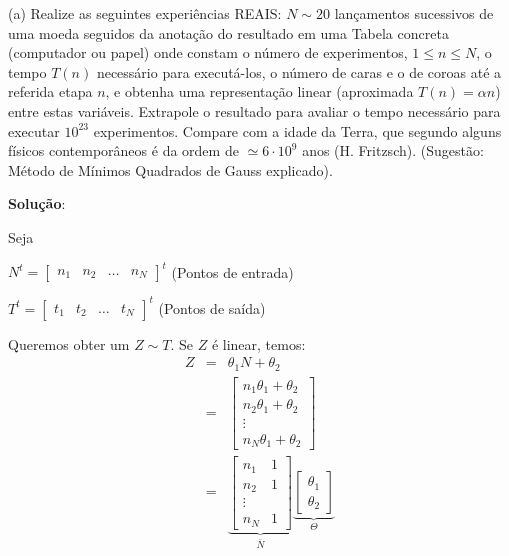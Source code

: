\begin{exercise}

\begin{description}
    \item (a) Realize as seguintes experiências REAIS: \(N\sim 20\) lançamentos sucessivos de uma moeda seguidos da anotação do resultado em uma Tabela concreta (computador ou papel) onde constam o número de experimentos, \(1 \le n \le N\), o tempo \(T(n)\) necessário para executá-los, o número de caras e o de coroas até a referida etapa \(n\), e obtenha uma representação linear (aproximada \(T(n) = \alpha n\)) entre estas variáveis. Extrapole o resultado para avaliar o tempo necessário para executar \(10^{23}\) experimentos. Compare com a idade da Terra, que segundo alguns físicos contemporâneos é da ordem de \(\simeq 6 \cdot 10^{9}\) anos (H. Fritzsch). (Sugestão: Método de Mínimos Quadrados de Gauss explicado).

{\color{red}
\textbf{Solução}:

Seja

\(N^t = \left[\begin{array}{cccc} n_1 & n_2 & \ldots & n_N \end{array}\right]^t\) (Pontos de entrada)

\(T^t = \left[\begin{array}{cccc} t_1 & t_2 & \ldots & t_N\end{array}\right]^t\) (Pontos de saída)

Queremos obter um \(Z \sim T\). Se \(Z\) é linear, temos:
\begin{eqnarray*}
Z
&=& \theta_1 N + \theta_2 \\
&=& \left[\begin{array}{c} n_1\theta_1+\theta_2 \\ n_2\theta_1+\theta_2 \\ \vdots \\ n_N\theta_1+\theta_2 \end{array}\right] \\
&=& \underbrace{\left[\begin{array}{cc} n_1 & 1 \\ n_2 & 1 \\ \vdots \\ n_N & 1 \end{array}\right]}_{\overline{N}}
\underbrace{\left[\begin{array}{c} \theta_1 \\ \theta_2 \end{array}\right]}_{\Theta}
\end{eqnarray*}

}
\end{description}
\end{exercise}
